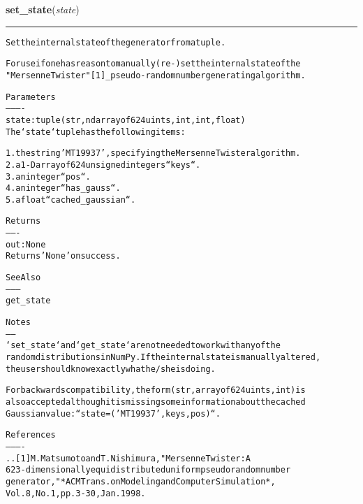 \hspace{.8\funcindent}\begin{boxedminipage}{\funcwidth}

    \raggedright \textbf{set\_state}(\textit{state})

    \vspace{-1.5ex}

    \rule{\textwidth}{0.5\fboxrule}
\setlength{\parskip}{2ex}
\begin{alltt}
Set the internal state of the generator from a tuple.

For use if one has reason to manually (re-)set the internal state of the
"Mersenne Twister"[1]\_ pseudo-random number generating algorithm.

Parameters
----------
state : tuple(str, ndarray of 624 uints, int, int, float)
    The `state` tuple has the following items:

    1. the string 'MT19937', specifying the Mersenne Twister algorithm.
    2. a 1-D array of 624 unsigned integers ``keys``.
    3. an integer ``pos``.
    4. an integer ``has\_gauss``.
    5. a float ``cached\_gaussian``.

Returns
-------
out : None
    Returns 'None' on success.

See Also
--------
get\_state

Notes
-----
`set\_state` and `get\_state` are not needed to work with any of the
random distributions in NumPy. If the internal state is manually altered,
the user should know exactly what he/she is doing.

For backwards compatibility, the form (str, array of 624 uints, int) is
also accepted although it is missing some information about the cached
Gaussian value: ``state = ('MT19937', keys, pos)``.

References
----------
.. [1] M. Matsumoto and T. Nishimura, "Mersenne Twister: A
   623-dimensionally equidistributed uniform pseudorandom number
   generator," *ACM Trans. on Modeling and Computer Simulation*,
   Vol. 8, No. 1, pp. 3-30, Jan. 1998.
\end{alltt}

\setlength{\parskip}{1ex}
    \end{boxedminipage}

    \label{QSTK:qstklearn:mldiagnostics:shuffle}

    \vspace{0.5ex}

